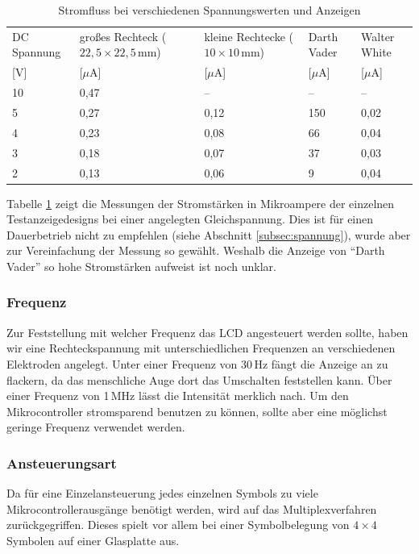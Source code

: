 \begin{table}[]
	\centering
	\caption{Stromfluss bei verschiedenen Spannungswerten und Anzeigen}
	\label{my-label}
	\begin{tabular}{p{1.2cm}|p{1.2cm}|p{1.2cm}|p{1.2cm}|p{1.2cm}}
		DC Spannung & großes Rechteck (\(22,5\times22,5\,\textrm{mm}\)) & kleine Rechtecke (\(10\times10\,\textrm{mm}\)) & Darth Vader & Walter White    \\
        {[}V{]} & {[}$\mu$A{]} & {[}$\mu$A{]} & {[}$\mu$A{]} & {[}$\mu$A{]} \\
         \hline
		10 & 0,47 & -- & --  & --   \\ \hline
		5  & 0,27 & 0,12 & 150 & 0,02 \\ \hline
		4  & 0,23 & 0,08 & 66  & 0,04 \\ \hline
		3  & 0,18 & 0,07 & 37  & 0,03 \\ \hline
		2  & 0,13 & 0,06 & 9   & 0,04 \\
	\end{tabular}
	\label{tab:volt}
\end{table}

Tabelle \ref{tab:volt} zeigt die Messungen der Stromstärken in Mikroampere der einzelnen Testanzeigedesigns bei einer angelegten Gleichspannung. Dies ist für einen Dauerbetrieb nicht zu empfehlen (siehe Abschnitt \ref{subsec:spannung}), wurde aber zur Vereinfachung der Messung so gewählt. Weshalb die Anzeige von “Darth Vader” so hohe Stromstärken aufweist ist noch unklar.

\subsubsection{Frequenz}
Zur Feststellung mit welcher Frequenz das LCD angesteuert werden sollte, haben wir eine Rechteckspannung mit unterschiedlichen Frequenzen an verschiedenen Elektroden angelegt. Unter einer Frequenz von 30\,Hz fängt die Anzeige an zu flackern, da das menschliche Auge dort das Umschalten feststellen kann. Über einer Frequenz von 1\,MHz lässt die Intensität merklich nach. Um den Mikrocontroller stromsparend benutzen zu können, sollte aber eine möglichst geringe Frequenz verwendet werden.

\subsubsection{Ansteuerungsart}
Da für eine Einzelansteuerung jedes einzelnen Symbols zu viele Mikrocontrollerausgänge benötigt werden, wird auf das Multiplexverfahren zurückgegriffen. Dieses spielt vor allem bei einer Symbolbelegung von \(4\times4\) Symbolen auf einer Glasplatte aus.

